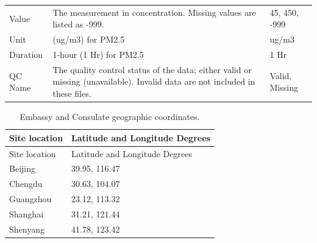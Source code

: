 \documentclass[12pt,]{article}
\begin{document}
\begin{longtable}[]{@{}lll@{}}
\begin{minipage}[t]{0.14\columnwidth}
Value\strut
\end{minipage} & \begin{minipage}[t]{0.60\columnwidth}\raggedright\strut
The measurement in concentration. Missing values are listed as
-999.\strut
\end{minipage} & \begin{minipage}[t]{0.11\columnwidth}\raggedright\strut
45, 450, -999\strut
\end{minipage}\tabularnewline
\begin{minipage}[t]{0.14\columnwidth}\raggedright\strut
Unit\strut
\end{minipage} & \begin{minipage}[t]{0.60\columnwidth}\raggedright\strut
(ug/m3) for PM2.5\strut
\end{minipage} & \begin{minipage}[t]{0.11\columnwidth}\raggedright\strut
ug/m3\strut
\end{minipage}\tabularnewline
\begin{minipage}[t]{0.14\columnwidth}\raggedright\strut
Duration\strut
\end{minipage} & \begin{minipage}[t]{0.60\columnwidth}\raggedright\strut
1-hour (1 Hr) for PM2.5\strut
\end{minipage} & \begin{minipage}[t]{0.11\columnwidth}\raggedright\strut
1 Hr\strut
\end{minipage}\tabularnewline
\begin{minipage}[t]{0.14\columnwidth}\raggedright\strut
QC Name\strut
\end{minipage} & \begin{minipage}[t]{0.60\columnwidth}\raggedright\strut
The quality control status of the data; either valid or missing
(unavailable). Invalid data are not included in these files.\strut
\end{minipage} & \begin{minipage}[t]{0.11\columnwidth}\raggedright\strut
Valid, Missing\strut
\end{minipage}\tabularnewline
\bottomrule
\end{longtable}

\newpage 

\begin{longtable}[]{@{}ll@{}}
\caption{Embassy and Consulate geographic coordinates.}\tabularnewline
\toprule
Site location & Latitude and Longitude Degrees\tabularnewline
\midrule
\endfirsthead
\toprule
Site location & Latitude and Longitude Degrees\tabularnewline
\midrule
\endhead
Beijing & 39.95, 116.47\tabularnewline
Chengdu & 30.63, 104.07\tabularnewline
Guangzhou & 23.12, 113.32\tabularnewline
Shanghai & 31.21, 121.44\tabularnewline
Shenyang & 41.78, 123.42\tabularnewline
\bottomrule
\end{longtable}
\end{document}
